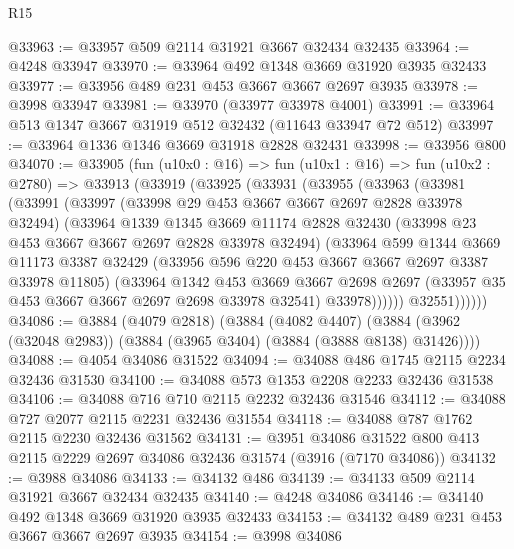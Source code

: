 \begin{lexlean}{R15}
\begin{coremodule}
@33963 := @33957 @509 @2114 @31921 @3667 @32434 @32435
@33964 := @4248 @33947
@33970 := @33964 @492 @1348 @3669 @31920 @3935 @32433
@33977 := @33956 @489 @231 @453 @3667 @3667 @2697 @3935
@33978 := @3998 @33947
@33981 := @33970 (@33977 @33978 @4001)
@33991 := @33964 @513 @1347 @3667 @31919 @512 @32432 (@11643 @33947 @72 @512)
@33997 := @33964 @1336 @1346 @3669 @31918 @2828 @32431
@33998 := @33956 @800
@34070 := @33905
    (fun (u10x0 : @16) =>
    fun (u10x1 : @16) =>
    fun (u10x2 : @2780) =>
    @33913
      (@33919
        (@33925
          (@33931
            (@33955
              (@33963
                (@33981
                  (@33991
                    (@33997
                      (@33998 @29 @453 @3667 @3667 @2697 @2828 @33978 @32494)
                      (@33964
                        @1339
                        @1345
                        @3669
                        @11174
                        @2828
                        @32430
                        (@33998 @23 @453 @3667 @3667 @2697 @2828 @33978 @32494)
                        (@33964
                          @599
                          @1344
                          @3669
                          @11173
                          @3387
                          @32429
                          (@33956 @596 @220 @453 @3667 @3667 @2697 @3387 @33978 @11805)
                          (@33964
                            @1342
                            @453
                            @3669
                            @3667
                            @2698
                            @2697
                            (@33957 @35 @453 @3667 @3667 @2697 @2698 @33978 @32541)
                            @33978))))))
                @32551))))))
@34086 := @3884
    (@4079 @2818)
    (@3884
      (@4082 @4407)
      (@3884 (@3962 (@32048 @2983)) (@3884 (@3965 @3404) (@3884 (@3888 @8138) @31426))))
@34088 := @4054 @34086 @31522
@34094 := @34088 @486 @1745 @2115 @2234 @32436 @31530
@34100 := @34088 @573 @1353 @2208 @2233 @32436 @31538
@34106 := @34088 @716 @710 @2115 @2232 @32436 @31546
@34112 := @34088 @727 @2077 @2115 @2231 @32436 @31554
@34118 := @34088 @787 @1762 @2115 @2230 @32436 @31562
@34131 := @3951
    @34086
    @31522
    @800
    @413
    @2115
    @2229
    @2697
    @34086
    @32436
    @31574
    (@3916 (@7170 @34086))
@34132 := @3988 @34086
@34133 := @34132 @486
@34139 := @34133 @509 @2114 @31921 @3667 @32434 @32435
@34140 := @4248 @34086
@34146 := @34140 @492 @1348 @3669 @31920 @3935 @32433
@34153 := @34132 @489 @231 @453 @3667 @3667 @2697 @3935
@34154 := @3998 @34086

\end{coremodule}
\end{lexlean}
